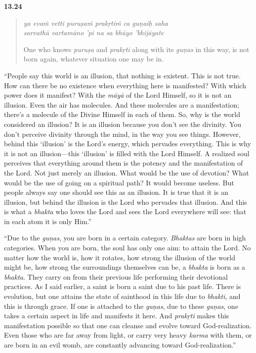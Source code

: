 \par\noindent\textbf{13.24}\par
\begin{verse}
\textit{ya evaṁ vetti puruṣaṁ prakṛtiṁ ca guṇaiḥ saha} \\
\textit{sarvathā vartamāno ’pi na sa bhūyo ’bhijāyate}

\noindent One who knows \textit{puruṣa} and \textit{prakṛti} along with its \textit{guṇas} in this way, is not born again, whatever situation one may be in.
\end{verse}
\par


\enquote{People say this world is an illusion, that nothing is existent. This is not true. How can there be no existence when everything here is manifested? With which power does it manifest? With the \textit{māyā} of the Lord Himself, so it is not an illusion. Even the air has molecules. And these molecules are a manifestation; there’s a molecule of the Divine Himself in each of them. So, why is the world considered an illusion? It is an illusion because you don’t see the divinity. You don’t perceive divinity through the mind, in the way you see things. However, behind this \enquote{illusion} is the Lord’s energy, which pervades everything. This is why it is not an illusion---this \enquote{illusion} is filled with the Lord Himself. A realized soul perceives that everything around them is the potency and the manifestation of the Lord. Not just merely an illusion. What would be the use of devotion? What would be the use of going on a spiritual path? It would become useless. But people always say one should see this as an illusion. It is true that it is an illusion, but behind the illusion is the Lord who pervades that illusion. And this is what a \textit{bhakta} who loves the Lord and sees the Lord everywhere will see: that in each atom it is only Him.}

\enquote{Due to the \textit{guṇas}, you are born in a certain category. \textit{Bhaktas} are born in high categories. When you are born, the soul has only one aim: to attain the Lord. No matter how the world is, how it rotates, how strong the illusion of the world might be, how strong the surroundings themselves can be, a \textit{bhakta} is born as a \textit{bhakta}. They carry on from their previous life performing their devotional practices. As I said earlier, a saint is born a saint due to his past life. There is evolution, but one attains the state of sainthood in this life due to \textit{bhakti}, and this is through grace. If one is attached to the \textit{guṇas}, due to these \textit{guṇas}, one takes a certain aspect in life and manifests it here. And \textit{prakṛti} makes this manifestation possible so that one can cleanse and evolve toward God-realization. Even those who are far away from light, or carry very heavy \textit{karma} with them, or are born in an evil womb, are constantly advancing toward God-realization.}

